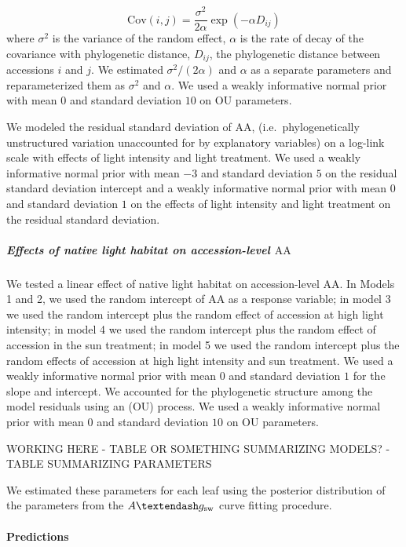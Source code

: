\documentclass[
  letterpaper,
  DIV=11,
  numbers=noendperiod]{scrartcl}
\let\oldparagraph\paragraph
\renewcommand{\paragraph}[1]{\oldparagraph{#1}\mbox{}}
\let\oldsubparagraph\subparagraph
\renewcommand{\subparagraph}[1]{\oldsubparagraph{#1}\mbox{}}
\newcommand{\aax}{$\mathrm{AA}$}
\newcommand{\agcurve}{$A \textendash g_\text{sw}$}
\begin{document}
\[\text{Cov}(i, j) = \frac{\sigma^2}{2 \alpha} \exp(-\alpha D_{ij})\]
where \(\sigma^2\) is the variance of the random effect, \(\alpha\) is
the rate of decay of the covariance with phylogenetic distance,
\(D_{ij}\), the phylogenetic distance between accessions \(i\) and
\(j\). We estimated \(\sigma^2 / (2 \alpha)\) and \(\alpha\) as a
separate parameters and reparameterized them as \(\sigma^2\) and
\(\alpha\). We used a weakly informative normal prior with mean \(0\)
and standard deviation \(10\) on OU parameters.

We modeled the residual standard deviation of \aax,
(i.e.~phylogenetically unstructured variation unaccounted for by
explanatory variables) on a log-link scale with effects of light
intensity and light treatment. We used a weakly informative normal prior
with mean \(-3\) and standard deviation \(5\) on the residual standard
deviation intercept and a weakly informative normal prior with mean
\(0\) and standard deviation \(1\) on the effects of light intensity and
light treatment on the residual standard deviation.

\subparagraph{\texorpdfstring{Effects of native light habitat on
accession-level
\aax}{Effects of native light habitat on accession-level }}\label{effects-of-native-light-habitat-on-accession-level}

We tested a linear effect of native light habitat on accession-level
\aax. In Models 1 and 2, we used the random intercept of \aax{} as a
response variable; in model 3 we used the random intercept plus the
random effect of accession at high light intensity; in model 4 we used
the random intercept plus the random effect of accession in the sun
treatment; in model 5 we used the random intercept plus the random
effects of accession at high light intensity and sun treatment. We used
a weakly informative normal prior with mean \(0\) and standard deviation
\(1\) for the slope and intercept. We accounted for the phylogenetic
structure among the model residuals using an (OU) process. We used a
weakly informative normal prior with mean \(0\) and standard deviation
\(10\) on OU parameters.

WORKING HERE - TABLE OR SOMETHING SUMMARIZING MODELS? - TABLE
SUMMARIZING PARAMETERS

We estimated these parameters for each leaf using the posterior
distribution of the parameters from the \agcurve{} curve fitting
procedure.

\paragraph{Predictions}\label{predictions}
\end{document}
